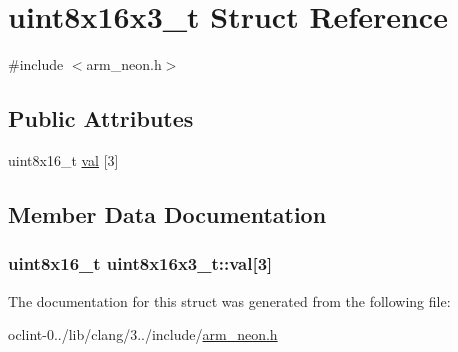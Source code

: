 \hypertarget{structuint8x16x3__t}{\section{uint8x16x3\-\_\-t Struct Reference}
\label{structuint8x16x3__t}
}


{\ttfamily \#include $<$arm\-\_\-neon.\-h$>$}

\subsection*{Public Attributes}
\begin{DoxyCompactItemize}
\item 
uint8x16\-\_\-t \hyperlink{structuint8x16x3__t_a81ffa44558b7664cc736f9d49b820664}{val} \mbox{[}3\mbox{]}
\end{DoxyCompactItemize}


\subsection{Member Data Documentation}
\hypertarget{structuint8x16x3__t_a81ffa44558b7664cc736f9d49b820664}{
\subsubsection[{val}]{\setlength{\rightskip}{0pt plus 5cm}uint8x16\-\_\-t uint8x16x3\-\_\-t\-::val\mbox{[}3\mbox{]}}}\label{structuint8x16x3__t_a81ffa44558b7664cc736f9d49b820664}


The documentation for this struct was generated from the following file\-:\begin{DoxyCompactItemize}
\item 
oclint-\/0../lib/clang/3../include/\hyperlink{arm__neon_8h}{arm\-\_\-neon.\-h}\end{DoxyCompactItemize}
